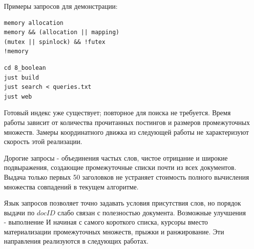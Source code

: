 \results
Примеры запросов для демонстрации:
\begin{lstlisting}
memory allocation
memory && (allocation || mapping)
(mutex || spinlock) && !futex
!memory
\end{lstlisting}
\begin{lstlisting}
cd 8_boolean
just build
just search < queries.txt
just web
\end{lstlisting}
Готовый индекс уже существует; повторное  для поиска
не требуется. Время работы зависит от количества прочитанных
постингов и размеров промежуточных множеств. Замеры координатного
движка из следующей работы не характеризуют скорость этой реализации.

Дорогие запросы - объединения частых слов, чистое отрицание и широкие
подвыражения, создающие промежуточные списки почти из всех документов.
Выдача только первых 50 заголовков не устраняет стоимость полного
вычисления множества совпадений в текущем алгоритме.

\conclusions
Язык запросов позволяет точно задавать условия присутствия слов,
но порядок выдачи по \(docID\) слабо связан с полезностью документа.
Возможные улучшения - выполнение И начиная с самого короткого
списка, курсоры вместо материализации промежуточных множеств,
прыжки и ранжирование. Эти направления реализуются в следующих работах.
